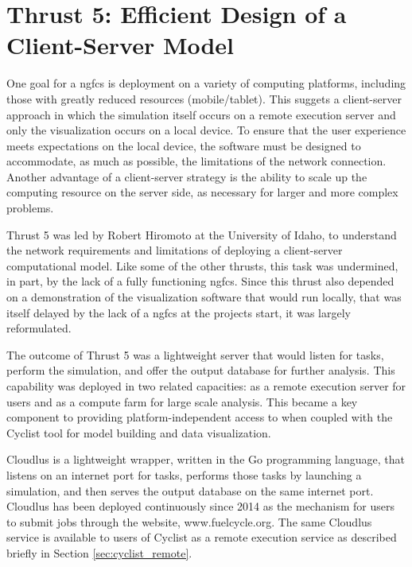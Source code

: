 \chapter{Thrust 5: Efficient Design of a Client-Server Model}\label{chap:thrust5}

One goal for a \gls{ngfcs} is deployment on a variety of computing platforms,
including those with greatly reduced resources (mobile/tablet).  This suggets
a client-server approach in which the simulation itself occurs on a remote
execution server and only the visualization occurs on a local device.  To
ensure that the user experience meets expectations on the local device, the
software must be designed to accommodate, as much as possible, the limitations
of the network connection.  Another advantage of a client-server strategy is
the ability to scale up the computing resource on the server side, as
necessary for larger and more complex problems.

Thrust 5 was led by Robert Hiromoto at the University of Idaho, to understand
the network requirements and limitations of deploying a client-server
computational model.  Like some of the other thrusts, this task was
undermined, in part, by the lack of a fully functioning \gls{ngfcs}.  Since
this thrust also depended on a demonstration of the visualization software
that would run locally, that was itself delayed by the lack of a \gls{ngfcs}
at the projects start, it was largely reformulated.

The outcome of Thrust 5 was a lightweight server that would listen for \Cyclus
tasks, perform the simulation, and offer the output database for further
analysis.  This capability was deployed in two related capacities: as a remote
execution server for \Cyclus users and as a compute farm for large scale
analysis.  This became a key component to providing platform-independent
access to \Cyclus when coupled with the Cyclist tool for model building and
data visualization.

Cloudlus is a lightweight wrapper, written in the Go programming
language, that listens on an internet port for tasks, performs
those tasks by launching a \Cyclus simulation, and then serves the output
database on the same internet port.  Cloudlus has been deployed continuously
since 2014 as the mechanism for users to submit \Cyclus jobs through the
website, www.fuelcycle.org.  The same Cloudlus service is available to users
of Cyclist as a remote execution service as described briefly in Section
\ref{sec:cyclist_remote}.

